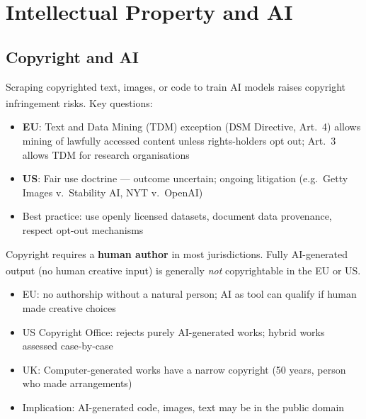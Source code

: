 \section{Intellectual Property and AI}

\subsection{Copyright and AI}

\begin{tcbitemize}[ skin=sectionraster ]
    \tcbitem[title={Training Data and Copyright}, raster multicolumn=3]
    Scraping copyrighted text, images, or code to train AI models raises copyright infringement risks.
    Key questions\textsuperscript{\cite[][pp.~150--180]{lloydInformationTechnologyLaw2020}}:
    \tcblower
    \begin{itemize}
        \item \textbf{EU}: Text and Data Mining (TDM) exception (DSM Directive, Art.\ 4) allows mining of lawfully accessed content unless rights-holders opt out; Art.\ 3 allows TDM for research organisations
        \item \textbf{US}: Fair use doctrine — outcome uncertain; ongoing litigation (e.g.\ Getty Images v.\ Stability AI, NYT v.\ OpenAI)
        \item Best practice: use openly licensed datasets, document data provenance, respect opt-out mechanisms
    \end{itemize}

    \tcbitem[title={AI-Generated Content and Authorship}, raster multicolumn=3]
    Copyright requires a \textbf{human author} in most jurisdictions.
    Fully AI-generated output (no human creative input) is generally \emph{not} copyrightable in the EU or US\textsuperscript{\cite[][pp.~185--200]{lloydInformationTechnologyLaw2020}}.
    \tcblower
    \begin{itemize}
        \item EU: no authorship without a natural person; AI as tool can qualify if human made creative choices
        \item US Copyright Office: rejects purely AI-generated works; hybrid works assessed case-by-case
        \item UK: Computer-generated works have a narrow copyright (50 years, person who made arrangements)
        \item Implication: AI-generated code, images, text may be in the public domain
    \end{itemize}
\end{tcbitemize}

